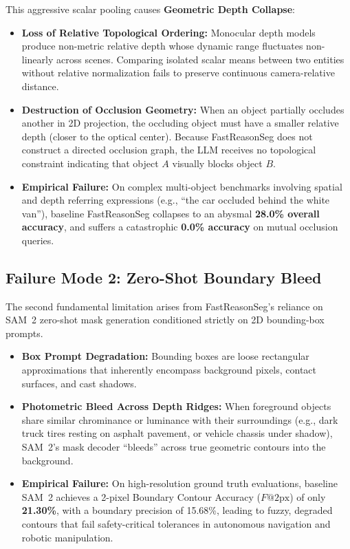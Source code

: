 \documentclass[10pt,twocolumn,letterpaper]{article}
\begin{document}
This aggressive scalar pooling causes \textbf{Geometric Depth Collapse}:
\begin{itemize}[leftmargin=*,itemsep=1pt]
    \item \textbf{Loss of Relative Topological Ordering:} Monocular depth models produce non-metric relative depth whose dynamic range fluctuates non-linearly across scenes. Comparing isolated scalar means between two entities without relative normalization fails to preserve continuous camera-relative distance.
    \item \textbf{Destruction of Occlusion Geometry:} When an object partially occludes another in 2D projection, the occluding object must have a smaller relative depth (closer to the optical center). Because FastReasonSeg does not construct a directed occlusion graph, the LLM receives no topological constraint indicating that object $A$ visually blocks object $B$.
    \item \textbf{Empirical Failure:} On complex multi-object benchmarks involving spatial and depth referring expressions (e.g., ``the car occluded behind the white van''), baseline FastReasonSeg collapses to an abysmal \textbf{28.0\% overall accuracy}, and suffers a catastrophic \textbf{0.0\% accuracy} on mutual occlusion queries.
\end{itemize}

\subsection{Failure Mode 2: Zero-Shot Boundary Bleed}
The second fundamental limitation arises from FastReasonSeg's reliance on SAM~2 zero-shot mask generation conditioned strictly on 2D bounding-box prompts.
\begin{itemize}[leftmargin=*,itemsep=1pt]
    \item \textbf{Box Prompt Degradation:} Bounding boxes are loose rectangular approximations that inherently encompass background pixels, contact surfaces, and cast shadows.
    \item \textbf{Photometric Bleed Across Depth Ridges:} When foreground objects share similar chrominance or luminance with their surroundings (e.g., dark truck tires resting on asphalt pavement, or vehicle chassis under shadow), SAM~2's mask decoder ``bleeds'' across true geometric contours into the background.
    \item \textbf{Empirical Failure:} On high-resolution ground truth evaluations, baseline SAM~2 achieves a 2-pixel Boundary Contour Accuracy ($F@2\text{px}$) of only \textbf{21.30\%}, with a boundary precision of 15.68\%, leading to fuzzy, degraded contours that fail safety-critical tolerances in autonomous navigation and robotic manipulation.
\end{itemize}
\end{document}
